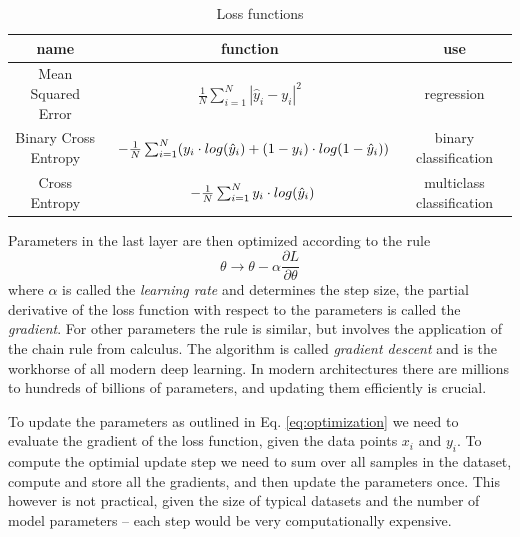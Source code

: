 \begin{table}
    \centering
    \renewcommand{\arraystretch}{1.3}
    \begin{tabular}{|c| c| c|}
    name & function & use \\[0.5ex] \hline
    Mean Squared Error & $\begin{array} {lcl} \frac{1}{N} \sum_{i=1}^N|\hat{y}_i - y_i|^2\end{array}$  & regression \\ [0.5ex]
    Binary Cross Entropy & $\begin{array} {r@{}l@{}} -\frac{1}{N} \sum_{i=1}^N (y_i \cdot log(\hat{y}_i) + (1 - y_i) \cdot log(1-\hat{y}_i)) \end{array}$ & binary classification \\ [0.5ex]
    Cross Entropy & $\begin{array} {r@{}l@{}} -\frac{1}{N} \sum_{i=1}^N y_i \cdot log(\hat{y}_i) \end{array}$ & multiclass classification \\ [0.5ex]
    \end{tabular}
    \caption{Loss functions}
    \label{table:losses}
\end{table}
Parameters in the last layer are then optimized according to the rule
\begin{equation}
    \label{eq:optimization}
    \theta \rightarrow \theta - \alpha \frac{\partial L}{\partial \theta}
\end{equation}
where $\alpha$ is called the \textit{learning rate} and determines the step size, the partial derivative of the loss function with respect to the parameters is called the \textit{gradient}.
For other parameters the rule is similar, but involves the application of the chain rule from calculus.
The algorithm is called \textit{gradient descent} and is the workhorse of all modern deep learning.
In modern architectures there are millions to hundreds of billions of parameters, and updating them efficiently is crucial.

To update the parameters as outlined in Eq. \ref{eq:optimization} we need to evaluate the gradient of the loss function, given the data points $x_i$ and $y_i$.
To compute the optimial update step we need to sum over all samples in the dataset, compute and store all the gradients, and then update the parameters once.
This however is not practical, given the size of typical datasets and the number of model parameters -- each step would be very computationally expensive.

